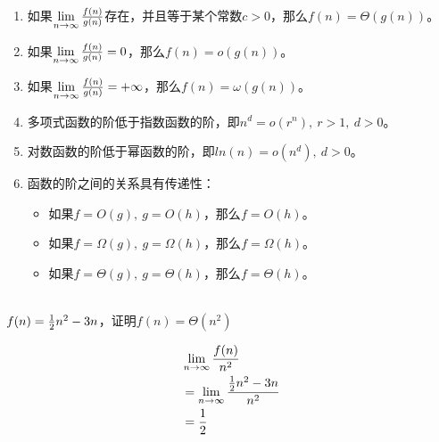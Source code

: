 \begin{enumerate}
    \item 如果$ \lim\limits_{n \rightarrow \infty} {f(n) \over g(n)} $存在，并且等于某个常数$ c > 0 $，那么$ f(n) = \Theta(g(n)) $。

    \item 如果$ \lim\limits_{n \rightarrow \infty} {f(n) \over g(n)} = 0 $，那么$ f(n) = o(g(n)) $。

    \item 如果$ \lim\limits_{n \rightarrow \infty} {f(n) \over g(n)} = +\infty $，那么$ f(n) = \omega(g(n)) $。

    \item 多项式函数的阶低于指数函数的阶，即$ n^d = o(r^n),\ r > 1,\ d > 0 $。

    \item 对数函数的阶低于幂函数的阶，即$ ln(n) = o(n^d),\ d > 0 $。

    \item 函数的阶之间的关系具有传递性：
          \begin{itemize}
              \item 如果$ f = O(g),\ g = O(h) $，那么$ f = O(h) $。

              \item 如果$ f = \Omega(g),\ g = \Omega(h) $，那么$ f = \Omega(h) $。

              \item 如果$ f = \Theta(g),\ g = \Theta(h) $，那么$ f = \Theta(h) $。
          \end{itemize}
\end{enumerate}

\vspace{0.5cm}

 \\

$ f(n) = {1 \over 2}n^2 - 3n $，证明$ f(n) = \Theta(n^2) $

\vspace{-0.5cm}

\begin{align*}
     & \lim\limits_{n \rightarrow \infty} {f(n) \over n^2}                  \\
     & = \lim\limits_{n \rightarrow \infty} {{1 \over 2}n^2 - 3n \over n^2} \\
     & = {1 \over 2}
\end{align*}

\vspace{0.5cm}

 \\

